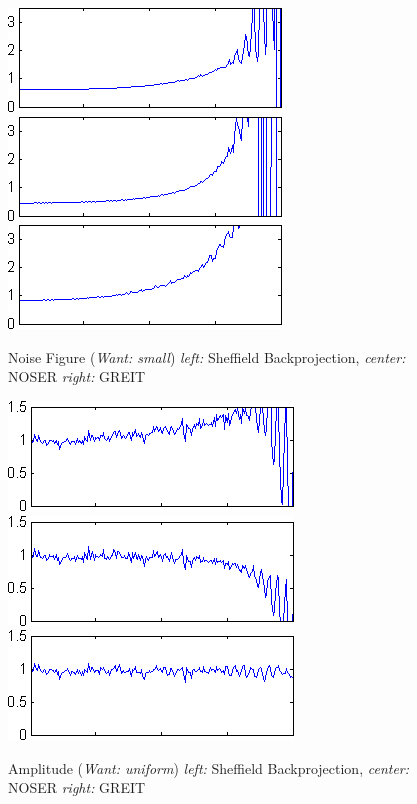 \documentclass[12pt]{iopart}
\begin{document}
\begin{figure}[bhtp]
\begin{center}
  \includegraphics[width= 0.3 \textwidth]
{../../tutorial/GREIT-evaluation/simulation_test_imgs/simulation_test04_11.png}
  \includegraphics[width= 0.3 \textwidth]
{../../tutorial/GREIT-evaluation/simulation_test_imgs/simulation_test04_21.png}
  \includegraphics[width= 0.3 \textwidth]
{../../tutorial/GREIT-evaluation/simulation_test_imgs/simulation_test04_41.png}
\caption{ \label{fig:rimage}
Noise Figure ({\em Want: small})                        
{\em left:} Sheffield Backprojection,
{\em center:} NOSER
{\em right:} GREIT
}
\end{center}
\end{figure}

\begin{figure}[bhtp]
\begin{center}
  \includegraphics[width= 0.3 \textwidth]
{../../tutorial/GREIT-evaluation/simulation_test_imgs/simulation_test04_12.png}
  \includegraphics[width= 0.3 \textwidth]
{../../tutorial/GREIT-evaluation/simulation_test_imgs/simulation_test04_22.png}
  \includegraphics[width= 0.3 \textwidth]
{../../tutorial/GREIT-evaluation/simulation_test_imgs/simulation_test04_42.png}
\caption{ \label{fig:rimage}
Amplitude ({\em Want: uniform})
{\em left:} Sheffield Backprojection,
{\em center:} NOSER
{\em right:} GREIT
}
\end{center}
\end{figure}
\end{document}
